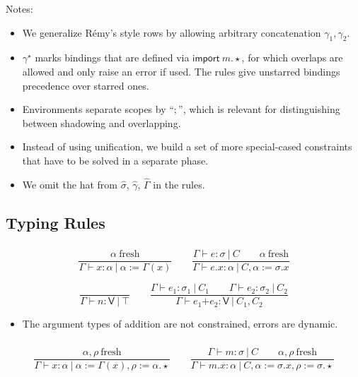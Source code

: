 \documentclass[10pt,a4paper]{article}
\newcommand\y[1]{\ensuremath{\mathsf{#1}}\xspace}
\newcommand\K[1]{\ensuremath{\textsf{#1}}}
\newcommand\note[1]{\noindent #1}
\begin{document}
\note{
Notes:
\begin{itemize}
\item We generalize R\'emy's style rows by allowing arbitrary concatenation $\gamma_1,\gamma_2$.
\item $\gamma^\star$ marks bindings that are defined via $\K{import}~m\K.{\star}$, for which overlaps are allowed and only raise an error if used. The rules give unstarred bindings precedence over starred ones.
\item Environments separate scopes by ``$;$'', which is relevant for distinguishing between shadowing and overlapping.
\item Instead of using unification, we build a set of more special-cased constraints that have to be solved in a separate phase.
\item We omit the hat from $\hat\sigma$, $\hat\gamma$, $\hat\Gamma$ in the rules.
\end{itemize}
}


\subsection*{Typing Rules}

\subsubsection*{}

$$
\frac{
  \alpha~\mathrm{fresh}
}{
  \Gamma \vdash x : \alpha ~|~ \alpha{:=}\Gamma(x)
}
\qquad
\frac{
  \Gamma \vdash e : \sigma ~|~ C
  \qquad
  \alpha~\mathrm{fresh}
}{
  \Gamma \vdash e\K.x : \alpha ~|~ C, \alpha{:=}\sigma.x
}
$$

$$
\frac{
}{
  \Gamma \vdash n : \y{V} ~|~ \top
}
\qquad
\frac{
  \Gamma \vdash e_1 : \sigma_1 ~|~ C_1
  \qquad
  \Gamma \vdash e_2 : \sigma_2 ~|~ C_2
}{
  \Gamma \vdash e_1\K+e_2 : \y{V} ~|~ C_1, C_2
}
$$

\note{
\begin{itemize}
\item The argument types of addition are not constrained, errors are dynamic.
\end{itemize}
}

\subsubsection*{}

$$
\frac{
  \alpha,\rho~\mathrm{fresh}
}{
  \Gamma \vdash x : \alpha ~|~ \alpha{:=}\Gamma(x), \rho{:=}\alpha.{\star}
}
\qquad
\frac{
  \Gamma \vdash m : \sigma ~|~ C
  \qquad
  \alpha,\rho~\mathrm{fresh}
}{
  \Gamma \vdash m\K.x : \alpha ~|~ C, \alpha{:=}\sigma.x, \rho{:=}\sigma.{\star}
}
$$
\end{document}
